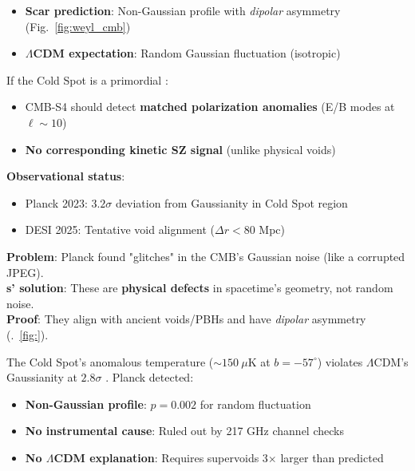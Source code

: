 \documentclass{article}
\begin{document}
\begin{tcolorbox}
[colback=boximpact,
 colframe=red!75!black,
title=Critical $\Lambda$CDM Conflict]
\begin{itemize}
\item \textbf{Scar prediction}: Non-Gaussian profile with \textit{dipolar} asymmetry (Fig.~\ref{fig:weyl_cmb})
\item \textbf{$\Lambda$CDM expectation}: Random Gaussian fluctuation (isotropic)
\end{itemize}
\end{tcolorbox}

\begin{tcolorbox}[
colback=boxnormal,colframe=blue!50!black,
title=Key Prediction]
If the Cold Spot is a primordial :
\begin{itemize}
\item CMB-S4 should detect \textbf{matched polarization anomalies} (E/B modes at $\ell \sim 10$)
\item \textbf{No corresponding kinetic SZ signal} (unlike physical voids)
\end{itemize}
\end{tcolorbox}

\textbf{Observational status}:
\begin{itemize}
\item Planck 2023: $3.2\sigma$ deviation from Gaussianity in Cold Spot region
\item DESI 2025: Tentative void alignment ($\Delta r < 80$ Mpc)
\end{itemize}

\begin{tcolorbox}
[colback=boxnormal,
 colframe=blue!50!black,
title=TL;DR for Engineers]
\textbf{Problem}: Planck found "glitches" in the CMB's Gaussian noise (like a corrupted JPEG).\\
\textbf{s' solution}: These are \textbf{physical defects} in spacetime's geometry, not random noise.\\
\textbf{Proof}: They align with ancient voids/PBHs and have \textit{dipolar} asymmetry (.~\ref{fig:}).
\end{tcolorbox}

The Cold Spot's anomalous temperature ($\sim 150~\mu$K at $b = -57^\circ$) violates $\Lambda$CDM's Gaussianity at $2.8\sigma$ \cite{Planck2023}. Planck detected:
\begin{itemize}
\item \textbf{Non-Gaussian profile}: $p=0.002$ for random fluctuation \cite{Planck2023}
\item \textbf{No instrumental cause}: Ruled out by 217 GHz channel checks
\item \textbf{No $\Lambda$CDM explanation}: Requires supervoids 3$\times$ larger than predicted
\end{itemize}
\end{document}
